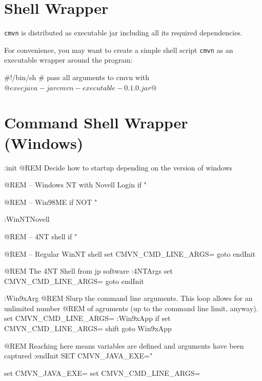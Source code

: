 \documentclass[a4paper,12pt,english,oneside,halfparskip]{scrartcl}
\newcommand{\cmvn}{\texttt{cmvn}}
\newcommand{\code}[1]{\texttt{#1}}
\begin{document}
\clearpage
\appendix

\section{Shell Wrapper}

\cmvn{} is distributed as executable jar including all its required dependencies. 

For convenience, you may want to create a simple shell script \code{cmvn} as an executable wrapper around the program:

\begin{Cmdline}[caption={Shell wrapper: \code{mvu}}]
#!/bin/sh
# pass all arguments to cmvn with $@
exec java -jar cmvn-executable-0.1.0.jar $@
\end{Cmdline}

\section{Command Shell Wrapper (Windows)}

\begin{Cmdline}[caption={Windows Command Shell wrapper: \code{cmvn.bat}}]
:init
@REM Decide how to startup depending on the version of windows

@REM -- Windows NT with Novell Login
if "%

@REM -- Win98ME
if NOT "%

:WinNTNovell

@REM -- 4NT shell
if "%

@REM -- Regular WinNT shell
set CMVN_CMD_LINE_ARGS=%
goto endInit

@REM The 4NT Shell from jp software
:4NTArgs
set CMVN_CMD_LINE_ARGS=%
goto endInit

:Win9xArg
@REM Slurp the command line arguments.  This loop allows for an unlimited number
@REM of agruments (up to the command line limit, anyway).
set CMVN_CMD_LINE_ARGS=
:Win9xApp
if %
set CMVN_CMD_LINE_ARGS=%
shift
goto Win9xApp

@REM Reaching here means variables are defined and arguments have been captured
:endInit
SET CMVN_JAVA_EXE="%


set CMVN_JAVA_EXE=
set CMVN_CMD_LINE_ARGS=
\end{Cmdline}
\end{document}
